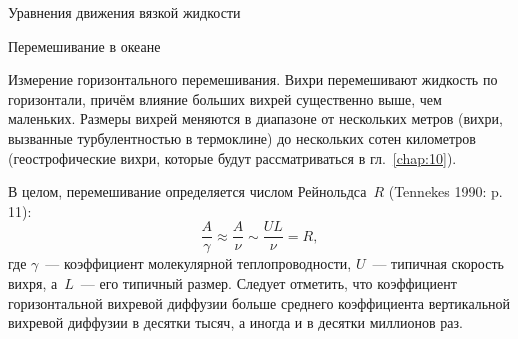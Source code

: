 \begin{chapter}{Уравнения движения вязкой жидкости}
\begin{section}{Перемешивание в океане}
\begin{paragraph}{Измерение горизонтального перемешивания.}
Вихри перемешивают жидкость по горизонтали, причём влияние больших вихрей
существенно выше, чем маленьких. Размеры вихрей меняются в диапазоне
от нескольких метров (вихри, вызванные 
турбулентностью 
в термоклине) до нескольких сотен километров 
(геострофические вихри, которые будут
рассматриваться в гл.~\ref{chap:10}).
%

В целом, перемешивание определяется числом 
Рейнольдса~$R$ (Tennekes 1990: p. 11):
\begin{equation}\label{eq:8.27}
 \frac{A}{\gamma} \approx \frac{A}{\nu} \sim \frac{UL}{\nu} = R,
\end{equation}
где $\gamma$~--- коэффициент молекулярной теплопроводности, $U$~--- типичная
скорость вихря, а~$L$~--- его типичный размер. 
Следует отметить, что коэффициент горизонтальной вихревой диффузии
больше среднего коэффициента вертикальной вихревой диффузии в десятки тысяч, 
а иногда и в десятки миллионов раз.
%


\end{paragraph}
\end{section}
\end{chapter}

